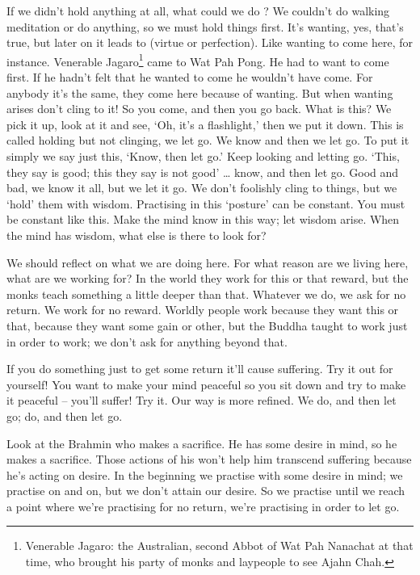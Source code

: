 If we didn't hold anything at all, what could we do ? We couldn't do walking meditation or do anything, so we must hold things first. It's wanting, yes, that's true, but later on it leads to  (virtue or perfection). Like wanting to come here, for instance. Venerable Jagaro\footnote{Venerable Jagaro: the Australian, second Abbot of Wat Pah Nanachat at that time, who brought his party of monks and laypeople to see Ajahn Chah.} came to Wat Pah Pong. He had to want to come first. If he hadn't felt that he wanted to come he wouldn't have come. For anybody it's the same, they come here because of wanting. But when wanting arises don't cling to it! So you come, and then you go back. What is this? We pick it up, look at it and see, `Oh, it's a flashlight,' then we put it down. This is called holding but not clinging, we let go. We know and then we let go. To put it simply we say just this, `Know, then let go.' Keep looking and letting go. `This, they say is good; this they say is not good' \ldots{} know, and then let go. Good and bad, we know it all, but we let it go. We don't foolishly cling to things, but we `hold' them with wisdom. Practising in this `posture' can be constant. You must be constant like this. Make the mind know in this way; let wisdom arise. When the mind has wisdom, what else is there to look for?

We should reflect on what we are doing here. For what reason are we living here, what are we working for? In the world they work for this or that reward, but the monks teach something a little deeper than that. Whatever we do, we ask for no return. We work for no reward. Worldly people work because they want this or that, because they want some gain or other, but the Buddha taught to work just in order to work; we don't ask for anything beyond that.

If you do something just to get some return it'll cause suffering. Try it out for yourself! You want to make your mind peaceful so you sit down and try to make it peaceful -- you'll suffer! Try it. Our way is more refined. We do, and then let go; do, and then let go.

Look at the Brahmin who makes a sacrifice. He has some desire in mind, so he makes a sacrifice. Those actions of his won't help him transcend suffering because he's acting on desire. In the beginning we practise with some desire in mind; we practise on and on, but we don't attain our desire. So we practise until we reach a point where we're practising for no return, we're practising in order to let go.

